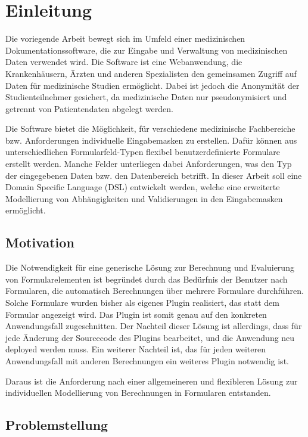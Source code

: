 \chapter{Einleitung}

Die voriegende Arbeit bewegt sich im Umfeld einer medizinischen Dokumentationssoftware, die zur Eingabe und
Verwaltung von medizinischen Daten verwendet wird. Die Software ist eine Webanwendung, die
Krankenhäusern, Ärzten und anderen Spezialisten den gemeinsamen Zugriff auf Daten für medizinische
Studien ermöglicht. Dabei ist jedoch die Anonymität der Studienteilnehmer gesichert, da medizinische Daten
nur pseudonymisiert und getrennt von Patientendaten abgelegt werden.

Die Software bietet die Möglichkeit, für verschiedene medizinische Fachbereiche bzw. Anforderungen
individuelle Eingabemasken zu erstellen. Dafür können aus unterschiedlichen Formularfeld-Typen flexibel
benutzerdefinierte Formulare erstellt werden. Manche Felder unterliegen dabei Anforderungen, was den Typ
der eingegebenen Daten bzw. den Datenbereich betrifft. In dieser Arbeit soll eine Domain Specific Language (DSL) entwickelt werden, 
welche eine erweiterte Modellierung von Abhängigkeiten und Validierungen in den Eingabemasken ermöglicht.


\section{Motivation}

Die Notwendigkeit für eine generische Lösung zur Berechnung und Eva\-lu\-ie\-rung von Formularelementen
ist begründet durch das Bedürfnis der Benutzer nach Formularen, die automatisch Berechnungen über
mehrere Formulare durchführen. Solche Formulare wurden bisher als eigenes Plugin realisiert, das statt dem Formular 
angezeigt wird. Das Plugin ist somit genau auf den konkreten Anwendungsfall zugeschnitten. Der Nachteil dieser
Lösung ist allerdings, dass für jede Änderung der Sourcecode des Plugins bearbeitet, und die Anwendung 
neu deployed werden muss. Ein weiterer Nachteil ist, das für jeden weiteren Anwendungsfall mit anderen Berechnungen
ein weiteres Plugin notwendig ist.

Daraus ist die Anforderung nach einer allgemeineren und flexibleren Lösung zur individuellen Modellierung von 
Berechnungen in Formularen entstanden.


\section{Problemstellung}

